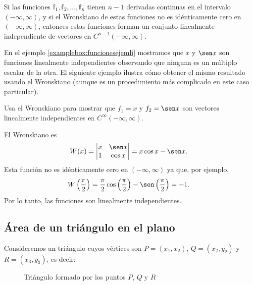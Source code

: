 \newpage

\begin{theorem}{}{}
    Si las funciones $\mathbb{f}_1, \mathbb{f}_2, \dots, \mathbb{f}_n$ tienen $n-1$ derivadas continuas en el intervalo $(-\infty, \infty)$, y si el Wronskiano de estas funciones no es idénticamente cero en $(-\infty, \infty)$, entonces estas funciones forman un conjunto linealmente independiente de vectores en $C^{n-1}(-\infty, \infty)$.
\end{theorem}

En el ejemplo \ref{examplebox:funcionesejemli} mostramos que $x$ y $\sen x$ son funciones linealmente independientes observando que ninguna es un múltiplo escalar de la otra. El siguiente ejemplo ilustra cómo obtener el mismo resultado usando el Wronskiano (aunque es un procedimiento más complicado en este caso particular).

\begin{examplebox}{}{}
    Usa el Wronskiano para mostrar que $f_1 = x$ y $f_2 = \sen x$ son vectores linealmente independientes en $C^\infty (-\infty, \infty)$.

    \tcblower
    \solucion El Wronskiano es
    $$W(x) = \begin{vmatrix} x & \sen x \\ 1 & \cos x \end{vmatrix} = x \cos x - \sen x.$$
    Esta función no es idénticamente cero en $(-\infty, \infty)$ ya que, por ejemplo,
    $$W\left( \frac{\pi}{2} \right) = \frac{\pi}{2} \cos \left( \frac{\pi}{2} \right) - \sen \left( \frac{\pi}{2} \right) = -1.$$
    Por lo tanto, las funciones son linealmente independientes.
\end{examplebox}

\subsection*{Área de un triángulo en el plano}

Consideremos un triángulo cuyos vértices son $P = (x_1, x_2)$, $Q = (x_2, y_2)$ y $R = (x_3, y_3)$, es decir:
\begin{figure}[h!]
    \centering
    \caption{Triángulo formado por los puntos $P$, $Q$ y $R$}\label{IISISJSNSKSOOSJJKKSKS}
\end{figure}

